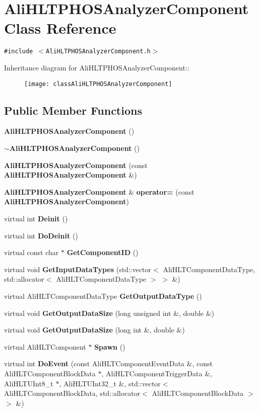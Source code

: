 \section{Ali\-HLTPHOSAnalyzer\-Component Class Reference}
\label{classAliHLTPHOSAnalyzerComponent}
{\tt \#include $<$Ali\-HLTPHOSAnalyzer\-Component.h$>$}

Inheritance diagram for Ali\-HLTPHOSAnalyzer\-Component::\begin{figure}[H]
\begin{center}
\leavevmode
\texttt{[image: classAliHLTPHOSAnalyzerComponent]}
\end{center}
\end{figure}
\subsection*{Public Member Functions}
\begin{CompactItemize}
\item 
{\bf Ali\-HLTPHOSAnalyzer\-Component} ()
\item 
{\bf $\sim$Ali\-HLTPHOSAnalyzer\-Component} ()
\item 
{\bf Ali\-HLTPHOSAnalyzer\-Component} (const {\bf Ali\-HLTPHOSAnalyzer\-Component} \&)
\item 
{\bf Ali\-HLTPHOSAnalyzer\-Component} \& {\bf operator=} (const {\bf Ali\-HLTPHOSAnalyzer\-Component})
\item 
virtual int {\bf Deinit} ()
\item 
virtual int {\bf Do\-Deinit} ()
\item 
virtual const char $\ast$ {\bf Get\-Component\-ID} ()
\item 
virtual void {\bf Get\-Input\-Data\-Types} (std::vector$<$ Ali\-HLTComponent\-Data\-Type, std::allocator$<$ Ali\-HLTComponent\-Data\-Type $>$ $>$ \&)
\item 
virtual Ali\-HLTComponent\-Data\-Type {\bf Get\-Output\-Data\-Type} ()
\item 
virtual void {\bf Get\-Output\-Data\-Size} (long unsigned int \&, double \&)
\item 
virtual void {\bf Get\-Output\-Data\-Size} (long int \&, double \&)
\item 
virtual Ali\-HLTComponent $\ast$ {\bf Spawn} ()
\item 
virtual int {\bf Do\-Event} (const Ali\-HLTComponent\-Event\-Data \&, const Ali\-HLTComponent\-Block\-Data $\ast$, Ali\-HLTComponent\-Trigger\-Data \&, Ali\-HLTUInt8\_\-t $\ast$, Ali\-HLTUInt32\_\-t \&, std::vector$<$ Ali\-HLTComponent\-Block\-Data, std::allocator$<$ Ali\-HLTComponent\-Block\-Data $>$ $>$ \&)
\end{CompactItemize}
